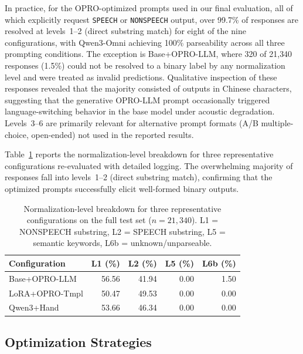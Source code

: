 \documentclass[11pt,a4paper]{article}
\begin{document}
In practice, for the OPRO-optimized prompts used in our final evaluation, all of which explicitly request \texttt{SPEECH} or \texttt{NONSPEECH} output, over 99.7\% of responses are resolved at levels~1--2 (direct substring match) for eight of the nine configurations, with Qwen3-Omni achieving 100\% parseability across all three prompting conditions. The exception is Base+OPRO-LLM, where 320 of 21{,}340 responses (1.5\%) could not be resolved to a binary label by any normalization level and were treated as invalid predictions. Qualitative inspection of these responses revealed that the majority consisted of outputs in Chinese characters, suggesting that the generative OPRO-LLM prompt occasionally triggered language-switching behavior in the base model under acoustic degradation. Levels~3--6 are primarily relevant for alternative prompt formats (A/B multiple-choice, open-ended) not used in the reported results.

Table~\ref{tab:normalization_levels} reports the normalization-level breakdown for three representative configurations re-evaluated with detailed logging. The overwhelming majority of responses fall into levels~1--2 (direct substring match), confirming that the optimized prompts successfully elicit well-formed binary outputs.

\begin{table}[t]
\centering
\caption{Normalization-level breakdown for three representative configurations on the full test set ($n = 21{,}340$). L1 = NONSPEECH substring, L2 = SPEECH substring, L5 = semantic keywords, L6b = unknown/unparseable.}
\label{tab:normalization_levels}
\footnotesize
\setlength{\tabcolsep}{4pt}
\renewcommand{\arraystretch}{1.12}
\begin{tabular}{lrrrr}
\toprule
\textbf{Configuration} & \textbf{L1 (\%)} & \textbf{L2 (\%)} & \textbf{L5 (\%)} & \textbf{L6b (\%)} \\
\midrule
Base+OPRO-LLM   & 56.56 & 41.94 & 0.00 & 1.50 \\
LoRA+OPRO-Tmpl   & 50.47 & 49.53 & 0.00 & 0.00 \\
Qwen3+Hand       & 53.66 & 46.34 & 0.00 & 0.00 \\
\bottomrule
\end{tabular}
\end{table}

\subsection{Optimization Strategies}
\label{subsec:optimization}
\end{document}
